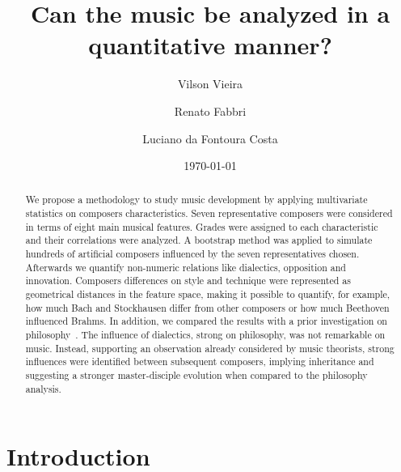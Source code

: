 \documentclass[
 aip,
 jmp,
 amsmath,amssymb,
 reprint,
]{revtex4-1}
\begin{document}

\title[Can the music be analyzed in a quantitative manner?]{Can the music be analyzed in a quantitative manner?}

\author{Vilson Vieira}

\author{Renato Fabbri}

\author{Luciano da Fontoura Costa}

\date{\today}

\begin{abstract}

We propose a
methodology
to study music development by
applying multivariate statistics on composers characteristics.
Seven representative composers were considered in terms of
eight main musical features. 
Grades
were assigned to each characteristic and their correlations were
analyzed. 
A bootstrap method was
applied to simulate hundreds of artificial composers
influenced by the seven representatives chosen.
Afterwards we quantify non-numeric relations like dialectics, opposition
and innovation.
Composers differences on style and technique were represented
as geometrical distances in the feature space, making it possible to
quantify, for example, how much Bach and Stockhausen differ from other composers or how
much Beethoven influenced Brahms.
In addition, we compared the results with a prior investigation
on
philosophy~\cite{Fabbri}. The influence of dialectics, strong on
philosophy, was not remarkable on music.
Instead, supporting an observation already considered by music
theorists, strong influences were identified between
subsequent composers, implying inheritance and suggesting a stronger
master-disciple evolution when compared to the philosophy analysis.
\end{abstract}


\maketitle

\section{\label{sec:level1}Introduction}
\end{document}
